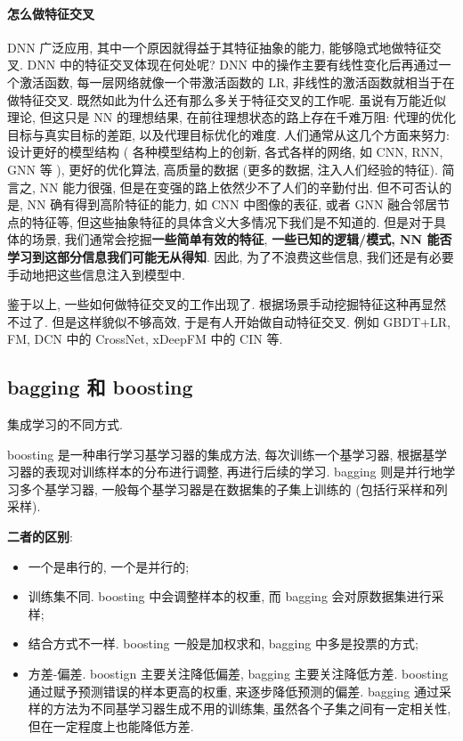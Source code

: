 \paragraph{怎么做特征交叉}
DNN 广泛应用, 其中一个原因就得益于其特征抽象的能力, 能够隐式地做特征交叉. DNN 中的特征交叉体现在何处呢? DNN 中的操作主要有线性变化后再通过一个激活函数, 每一层网络就像一个带激活函数的 LR, 非线性的激活函数就相当于在做特征交叉. 既然如此为什么还有那么多关于特征交叉的工作呢. 虽说有万能近似理论, 但这只是 NN 的理想结果, 在前往理想状态的路上存在千难万阻: 代理的优化目标与真实目标的差距, 以及代理目标优化的难度. 人们通常从这几个方面来努力: 设计更好的模型结构 ( 各种模型结构上的创新, 各式各样的网络, 如 CNN, RNN, GNN 等 ), 更好的优化算法, 高质量的数据 (更多的数据, 注入人们经验的特征). 简言之, NN 能力很强, 但是在变强的路上依然少不了人们的辛勤付出. 但不可否认的是, NN 确有得到高阶特征的能力, 如 CNN 中图像的表征, 或者 GNN 融合邻居节点的特征等, 但这些抽象特征的具体含义大多情况下我们是不知道的. 但是对于具体的场景, 我们通常会挖掘\textbf{一些简单有效的特征}, \textbf{一些已知的逻辑/模式, NN 能否学习到这部分信息我们可能无从得知}. 因此, 为了不浪费这些信息, 我们还是有必要手动地把这些信息注入到模型中.

鉴于以上, 一些如何做特征交叉的工作出现了. 根据场景手动挖掘特征这种再显然不过了. 但是这样貌似不够高效, 于是有人开始做自动特征交叉. 例如 GBDT+LR, FM, DCN 中的 CrossNet, xDeepFM 中的 CIN 等.

\subsection{bagging 和 boosting}
集成学习的不同方式. 

boosting 是一种串行学习基学习器的集成方法, 每次训练一个基学习器, 根据基学习器的表现对训练样本的分布进行调整, 再进行后续的学习. bagging 则是并行地学习多个基学习器, 一般每个基学习器是在数据集的子集上训练的 (包括行采样和列采样). 

\textbf{二者的区别}:
\begin{itemize}
	\item 一个是串行的, 一个是并行的;
	
	\item 训练集不同. boosting 中会调整样本的权重, 而 bagging 会对原数据集进行采样;
	
	\item 结合方式不一样. boosting 一般是加权求和, bagging 中多是投票的方式;
	
	\item 方差-偏差. boostign 主要关注降低偏差, bagging 主要关注降低方差. boosting 通过赋予预测错误的样本更高的权重, 来逐步降低预测的偏差. bagging 通过采样的方法为不同基学习器生成不用的训练集, 虽然各个子集之间有一定相关性, 但在一定程度上也能降低方差.
\end{itemize}

